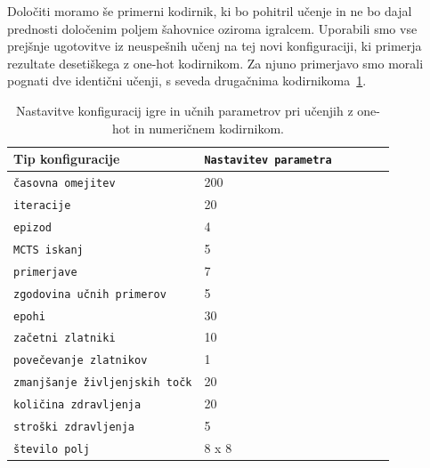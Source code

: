 \documentclass[a4paper, 12pt]{book}
\begin{document}
Določiti moramo še primerni kodirnik, ki bo pohitril učenje in ne bo dajal prednosti določenim poljem šahovnice oziroma igralcem.
Uporabili smo vse prejšnje ugotovitve iz neuspešnih učenj na tej novi konfiguraciji, ki primerja rezultate desetiškega z one-hot kodirnikom.
Za njuno primerjavo smo morali pognati dve identični učenji, s seveda drugačnima kodirnikoma~\ref{tableCompareOneHotNumeric}.

\begin{table}
	\begin{center}
		\begin{tabular}{p{0.5\linewidth}|p{0.5\linewidth}}
			Tip konfiguracije                          & {\tt Nastavitev parametra} \\ \hline
			{\tt časovna omejitev}                     & 200                     \\
			{\tt iteracije}                            & 20                      \\
			{\tt epizod}                               & 4                       \\
			{\tt MCTS iskanj}                          & 5                        \\
			{\tt primerjave}                           & 7                        \\
			{\tt zgodovina učnih primerov}             & 5                       \\
			{\tt epohi}                                & 30                      \\
			{\tt začetni zlatniki}                     & 10                       \\
			{\tt povečevanje zlatnikov}                & 1                       \\
			{\tt zmanjšanje življenjskih točk}         & 20                      \\
			{\tt količina zdravljenja}                 & 20                      \\
			{\tt stroški zdravljenja}                  & 5                       \\
			{\tt število polj}                         & 8 x 8                   \\
			
		\end{tabular}
	\end{center}
	\caption{Nastavitve konfiguracij igre in učnih parametrov pri učenjih z one-hot in numeričnem kodirnikom.}
	\label{tableCompareOneHotNumeric}
\end{table}
\end{document}
